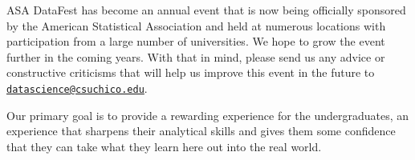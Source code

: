 \documentclass[]{article}
\begin{document}
ASA DataFest has become an annual event that is now being officially
sponsored by the American Statistical Association and held at numerous
locations with participation from a large number of universities. We
hope to grow the event further in the coming years. With that in mind,
please send us any advice or constructive criticisms that will help us
improve this event in the future to
\href{mailto:datascience@csuchico.edu}{\nolinkurl{datascience@csuchico.edu}}.

Our primary goal is to provide a rewarding experience for the
undergraduates, an experience that sharpens their analytical skills and
gives them some confidence that they can take what they learn here out
into the real world.
\end{document}
